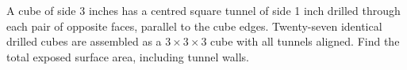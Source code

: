 A cube of side 3 inches has a centred square tunnel of side 1 inch drilled through each pair of opposite faces, parallel to the cube edges. Twenty-seven identical drilled cubes are assembled as a $3\times3\times3$ cube with all tunnels aligned. Find the total exposed surface area, including tunnel walls.
